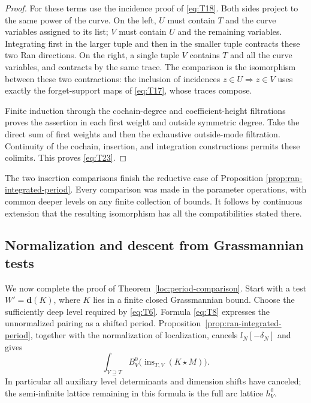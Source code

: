 \begin{proof}
For these terms use the incidence proof of \eqref{eq:T18}.  Both sides
project to the same power of the curve.  On the left, $U$ must contain
$T$ and the curve variables assigned to its list; $V$ must contain $U$
and the remaining variables.  Integrating first in the larger tuple and
then in the smaller tuple contracts these two Ran directions.  On the
right, a single tuple $V$ contains $T$ and all the curve variables, and
contracts by the same trace.  The comparison is the isomorphism between
these two contractions: the inclusion of incidences $z\in U\Rightarrow
z\in V$ uses exactly the forget-support maps of \eqref{eq:T17}, whose
traces compose.

Finite induction through the cochain-degree and coefficient-height
filtrations proves the assertion in each first weight and outside
symmetric degree.  Take the direct sum of first weights and then the
exhaustive outside-mode filtration.  Continuity of the cochain,
insertion, and integration constructions permits these colimits.
This proves \eqref{eq:T23}.
\end{proof}

The two insertion comparisons finish the reductive case of Proposition
\ref{prop:ran-integrated-period}.  Every comparison was made in the
parameter operations, with common deeper levels on any finite collection
of bounds.  It follows by continuous extension that the resulting
isomorphism has all the compatibilities stated there.

\subsection{Normalization and descent from Grassmannian tests}

We now complete the proof of Theorem~\ref{loc:period-comparison}.
Start with a test
$W'=\mathbf d(K)$, where $K$ lies in a finite closed Grassmannian bound.
Choose the sufficiently deep level required by \eqref{eq:T6}.  Formula
\eqref{eq:T8} expresses the unnormalized pairing as a shifted period.
Proposition~\ref{prop:ran-integrated-period}, together with the
normalization of localization, cancels $l_N[-\delta_N]$ and gives
\begin{equation}\label{eq:T25}
       \int_{V\supseteq T}
       B^0_V\bigl(\operatorname{ins}_{T,V}(K\star M)\bigr).
\end{equation}
In particular all auxiliary level determinants and dimension shifts have
canceled; the semi-infinite lattice remaining in this formula is the full
arc lattice $h_V^0$.


